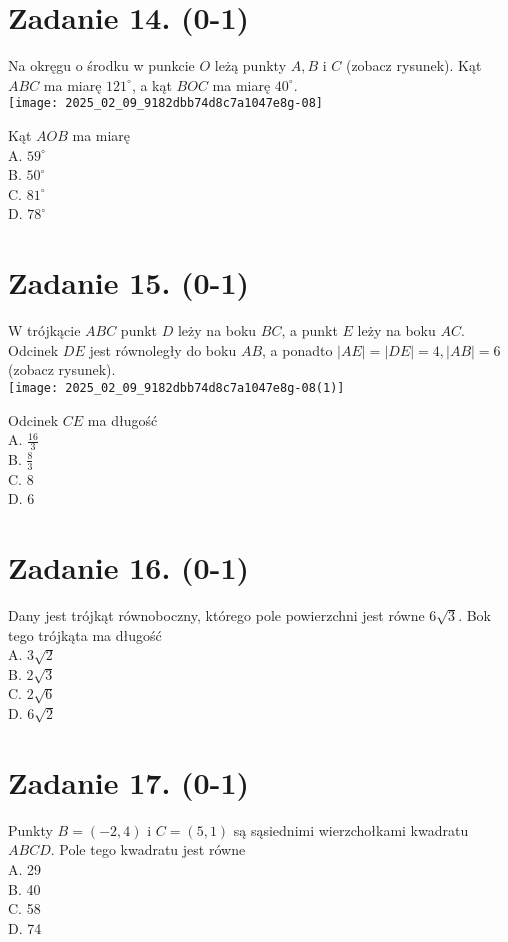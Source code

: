 \documentclass[10pt]{article}
\begin{document}
\section*{Zadanie 14. (0-1)}
Na okręgu o środku w punkcie \(O\) leżą punkty \(A, B\) i \(C\) (zobacz rysunek). Kąt \(A B C\) ma miarę \(121^{\circ}\), a kąt \(B O C\) ma miarę \(40^{\circ}\).\\
\texttt{[image: 2025\_02\_09\_9182dbb74d8c7a1047e8g-08]}

Kąt \(A O B\) ma miarę\\
A. \(59^{\circ}\)\\
B. \(50^{\circ}\)\\
C. \(81^{\circ}\)\\
D. \(78^{\circ}\)

\section*{Zadanie 15. (0-1)}
W trójkącie \(A B C\) punkt \(D\) leży na boku \(B C\), a punkt \(E\) leży na boku \(A C\). Odcinek \(D E\) jest równoległy do boku \(A B\), a ponadto \(|A E|=|D E|=4,|A B|=6\) (zobacz rysunek).\\
\texttt{[image: 2025\_02\_09\_9182dbb74d8c7a1047e8g-08(1)]}

Odcinek \(C E\) ma długość\\
A. \(\frac{16}{3}\)\\
B. \(\frac{8}{3}\)\\
C. 8\\
D. 6

\section*{Zadanie 16. (0-1)}
Dany jest trójkąt równoboczny, którego pole powierzchni jest równe \(6 \sqrt{3}\). Bok tego trójkąta ma długość\\
A. \(3 \sqrt{2}\)\\
B. \(2 \sqrt{3}\)\\
C. \(2 \sqrt{6}\)\\
D. \(6 \sqrt{2}\)

\section*{Zadanie 17. (0-1)}
Punkty \(B=(-2,4)\) i \(C=(5,1)\) są sąsiednimi wierzchołkami kwadratu \(A B C D\). Pole tego kwadratu jest równe\\
A. 29\\
B. 40\\
C. 58\\
D. 74
\end{document}

